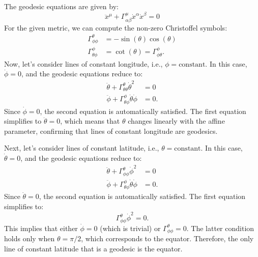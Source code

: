 \begin{solution}[(i)]
  The geodesic equations are given by:
  \begin{equation}\label{eq:geodesic_equation}
    \ddot{x}^\mu + \Gamma_{\alpha\beta}^\mu \dot{x}^\alpha \dot{x}^\beta = 0
  \end{equation}
  For the given metric, we can compute the non-zero Christoffel symbols:
  \begin{align*}
    \Gamma_{\phi\phi}^\theta &= -\sin(\theta)\cos(\theta) \\
    \Gamma_{\theta\phi}^\phi &= \cot(\theta) = \Gamma_{\phi\theta}^\phi
  .\end{align*}
  Now, let's consider lines of constant longitude, i.e., $\phi = \text{constant}$. In this case, $\dot{\phi} = 0$, and the geodesic equations reduce to:
  \begin{align*}
    \ddot{\theta} + \Gamma_{\theta\theta}^\theta \dot{\theta}^2 &= 0 \\
    \ddot{\phi} + \Gamma_{\theta\phi}^\phi \dot{\theta}\dot{\phi} &= 0
  .\end{align*}
  Since $\dot{\phi} = 0$, the second equation is automatically satisfied. The first equation simplifies to $\ddot{\theta} = 0$, which means that $\theta$ changes linearly with the affine parameter, confirming that lines of constant longitude are geodesics.

  Next, let's consider lines of constant latitude, i.e., $\theta = \text{constant}$. In this case, $\dot{\theta} = 0$, and the geodesic equations reduce to:
  \begin{align*}
    \ddot{\theta} + \Gamma_{\phi\phi}^\theta \dot{\phi}^2 &= 0 \\
    \ddot{\phi} + \Gamma_{\theta\phi}^\phi \dot{\theta}\dot{\phi} &= 0
  .\end{align*}
  Since $\dot{\theta} = 0$, the second equation is automatically satisfied. The first equation simplifies to:
  \[%
    \Gamma_{\phi\phi}^\theta \dot{\phi}^2 = 0
  .\]%
  This implies that either $\dot{\phi} = 0$ (which is trivial) or $\Gamma_{\phi\phi}^\theta = 0$. The latter condition holds only when $\theta = \pi/2$, which corresponds to the equator. Therefore, the only line of constant latitude that is a geodesic is the equator.
\end{solution}

